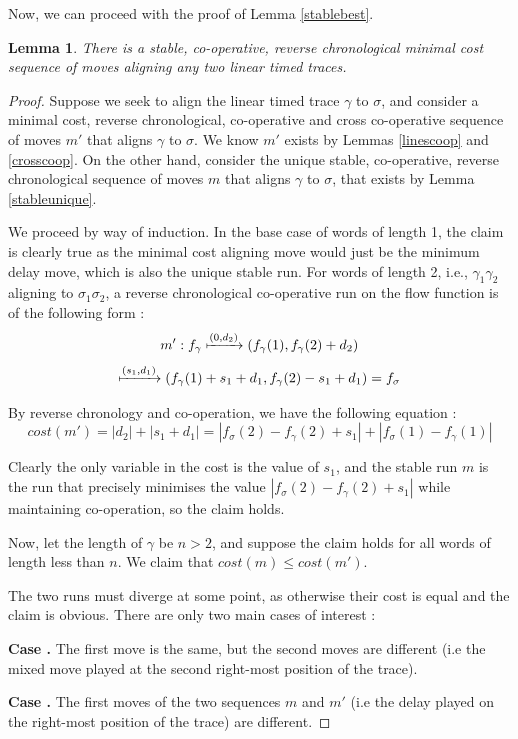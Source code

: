 \documentclass[conference]{IEEEtran}
\newcounter{cases}
\newcounter{subcases}[cases]
\newenvironment{mycase}
{
	\setcounter{cases}{0}
	\setcounter{subcases}{0}
	\newcommand{\case}
	{
		\par\indent\stepcounter{cases}\textbf{Case \thecases.}
	}
	\newcommand{\subcase}
	{
		\par\indent\stepcounter{subcases}\textbf{ \>\>\>\> Subcase (\thesubcases)}
	}
}
{
	\par
}
\renewcommand*\thecases{\arabic{cases}}
\renewcommand*\thesubcases{\alph{subcases}}
\newtheorem*{lemma*}{Lemma}
\begin{document}
Now, we can proceed with the proof of Lemma \ref{stablebest}. 
\begin{lemma*}
	There is a stable, co-operative, reverse chronological minimal cost sequence of moves aligning any two linear timed traces. 
\end{lemma*}
\begin{proof}
Suppose we seek to align the linear timed trace $\gamma$ to $\sigma$, and consider a minimal cost, reverse chronological, co-operative and cross co-operative sequence of moves $m'$ that aligns $\gamma$ to $\sigma$. 
We know $m'$ exists by Lemmas \ref{linescoop} and \ref{crosscoop}. 
On the other hand, consider the unique stable, co-operative, reverse chronological sequence of moves $m$ that aligns $\gamma$ to $\sigma$, that exists by Lemma \ref{stableunique}. 

We proceed by way of induction. 
In the base case of words of length 1, the claim is clearly true as the minimal cost aligning move would just be the minimum delay move, which is also the unique stable run. 
For words of length 2, i.e., $\gamma_1\gamma_2$ aligning to $\sigma_1\sigma_2$, a reverse chronological co-operative run on the flow function is of the following form : $$m' : f_\gamma \xmapsto{(0,d_2)} (f_\gamma(1), f_\gamma(2) + d_2)$$$$ \xmapsto{(s_1,d_1)} (f_\gamma(1) + s_1 + d_1, f_\gamma(2) - s_1 + d_1) = f_\sigma$$

By reverse chronology and co-operation, we have the following equation : 
$$cost(m') = |d_2| + |s_1 + d_1| = |f_\sigma(2) - f_\gamma(2) + s_1| + |f_\sigma(1) - f_\gamma(1)|$$

Clearly the only variable in the cost is the value of $s_1$, and the stable run $m$ is the run that precisely minimises the value $|f_\sigma(2) - f_\gamma(2) + s_1|$ while maintaining co-operation, so the claim holds. 

Now, let the length of $\gamma$ be $n > 2$, and suppose the claim holds for all words of length less than $n$. 
We claim that $cost(m) \leq cost(m')$. 

The two runs must diverge at some point, as otherwise their cost is equal and the claim is obvious. There are only two main cases of interest : 
\begin{mycase}
\case The first move is the same, but the second moves are different (i.e the mixed move played at the second right-most position of the trace). 
\case The first moves of the two sequences $m$ and $m'$ (i.e the delay played on the right-most position of the trace) are different. 


\end{mycase}
\end{proof}
\end{document}
